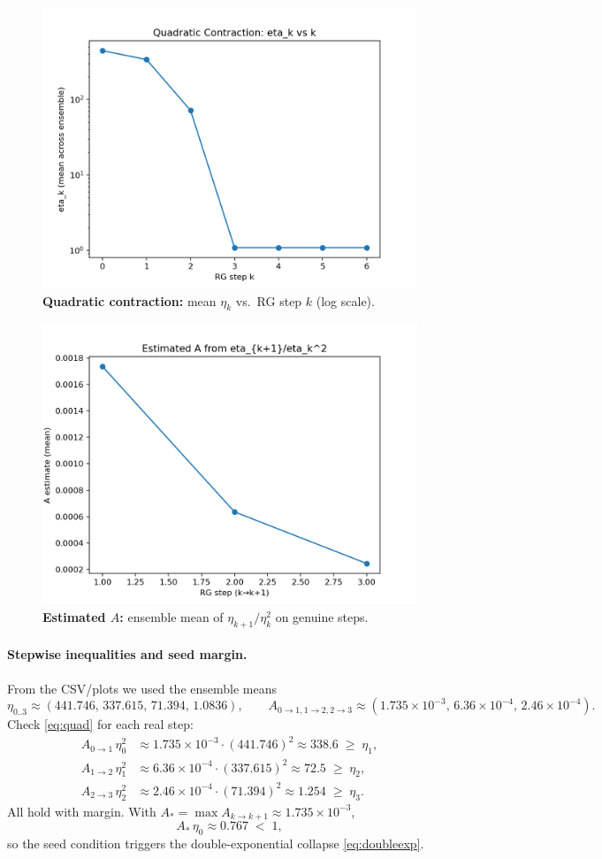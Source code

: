 \documentclass[11pt]{article}
\begin{document}
\begin{figure}[t]
  \centering
  \includegraphics[width=.65\linewidth]{custom_results/eta_vs_k.png}
  \caption{\textbf{Quadratic contraction:} mean $\eta_k$ vs.\ RG step $k$ (log scale).}
  \label{fig:etak}
\end{figure}

\begin{figure}[t]
  \centering
  \includegraphics[width=.65\linewidth]{custom_results/A_vs_k.png}
  \caption{\textbf{Estimated $A$:} ensemble mean of $\eta_{k+1}/\eta_k^2$ on genuine steps.}
  \label{fig:Ak}
\end{figure}

\paragraph{Stepwise inequalities and seed margin.}
From the CSV/plots we used the ensemble means
\[
\eta_{0..3}\approx (441.746,\,337.615,\,71.394,\,1.0836),\qquad 
A_{0\to1,1\to2,2\to3}\approx (1.735\times10^{-3},\,6.36\times10^{-4},\,2.46\times10^{-4}).
\]
Check \eqref{eq:quad} for each real step:
\[
\begin{aligned}
A_{0\to1}\,\eta_0^2 &\approx 1.735{\times}10^{-3}\cdot(441.746)^2 \approx 338.6 \;\ge\; \eta_1,\\
A_{1\to2}\,\eta_1^2 &\approx 6.36 {\times}10^{-4}\cdot(337.615)^2 \approx 72.5 \;\ge\; \eta_2,\\
A_{2\to3}\,\eta_2^2 &\approx 2.46 {\times}10^{-4}\cdot(71.394)^2  \approx 1.254\;\ge\; \eta_3.
\end{aligned}
\]
All hold with margin. With $A_*=\max A_{k\to k+1}\approx 1.735\times 10^{-3}$,
\[
A_*\,\eta_0 \approx 0.767\;<\;1,
\]
so the seed condition triggers the double-exponential collapse \eqref{eq:doubleexp}.
\end{document}
